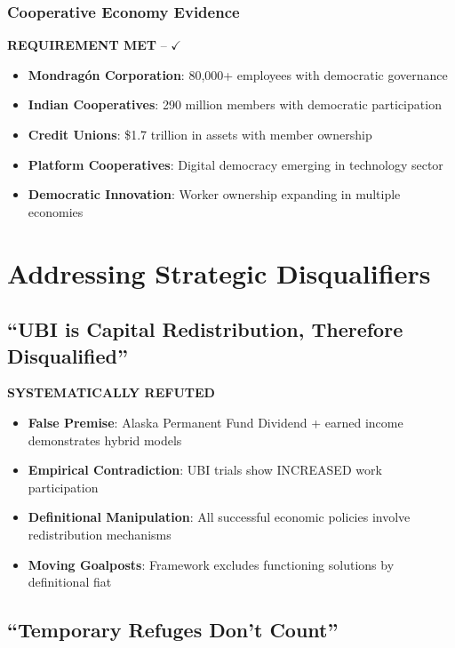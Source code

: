 \documentclass[11pt,a4paper]{article}
\newcommand{\greencheckmark}{{\color{validationgreen}\textbf{$\checkmark$}}}
\newcommand{\verdict}[1]{\textcolor{primaryblue}{\textbf{#1}}}
\newcommand{\evidence}[1]{\textcolor{validationgreen}{\textbf{#1}}}
\begin{document}
\subsubsection{Cooperative Economy Evidence}

\evidence{REQUIREMENT MET} -- \greencheckmark

\begin{itemize}[leftmargin=*]
\item \textbf{Mondragón Corporation}: 80,000+ employees with democratic governance
\item \textbf{Indian Cooperatives}: 290 million members with democratic participation
\item \textbf{Credit Unions}: \$1.7 trillion in assets with member ownership  
\item \textbf{Platform Cooperatives}: Digital democracy emerging in technology sector
\item \textbf{Democratic Innovation}: Worker ownership expanding in multiple economies
\end{itemize}

\section{Addressing Strategic Disqualifiers}

\subsection{``UBI is Capital Redistribution, Therefore Disqualified''}

\verdict{SYSTEMATICALLY REFUTED}

\begin{itemize}[leftmargin=*]
\item \textbf{False Premise}: Alaska Permanent Fund Dividend + earned income demonstrates hybrid models
\item \textbf{Empirical Contradiction}: UBI trials show INCREASED work participation 
\item \textbf{Definitional Manipulation}: All successful economic policies involve redistribution mechanisms
\item \textbf{Moving Goalposts}: Framework excludes functioning solutions by definitional fiat
\end{itemize}

\subsection{``Temporary Refuges Don't Count''}
\end{document}
